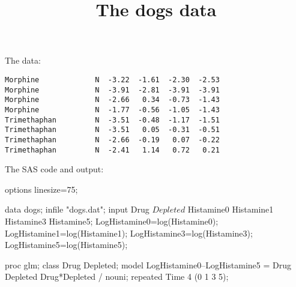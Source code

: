 \documentclass{article}
\title{The dogs data}
\begin{document}
\maketitle
The data:
\begin{verbatim}
Morphine             N  -3.22  -1.61  -2.30  -2.53 
Morphine             N  -3.91  -2.81  -3.91  -3.91 
Morphine             N  -2.66   0.34  -0.73  -1.43 
Morphine             N  -1.77  -0.56  -1.05  -1.43 
Trimethaphan         N  -3.51  -0.48  -1.17  -1.51 
Trimethaphan         N  -3.51   0.05  -0.31  -0.51 
Trimethaphan         N  -2.66  -0.19   0.07  -0.22 
Trimethaphan         N  -2.41   1.14   0.72   0.21 
\end{verbatim}
The SAS code and output:
\begin{Winput}
options linesize=75;

   data dogs; 
      infile "dogs.dat";
      input Drug $ Depleted $ Histamine0 Histamine1 
            Histamine3 Histamine5; 
      LogHistamine0=log(Histamine0); 
      LogHistamine1=log(Histamine1); 
      LogHistamine3=log(Histamine3); 
      LogHistamine5=log(Histamine5); 

   proc glm; 
      class Drug Depleted; 
      model LogHistamine0--LogHistamine5 = 
            Drug Depleted Drug*Depleted / nouni; 
      repeated Time 4 (0 1 3 5); 
\end{Winput}
\end{document}
